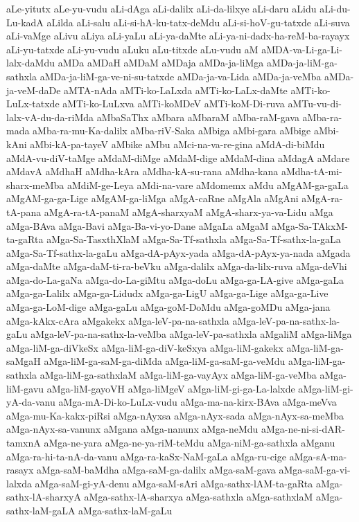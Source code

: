 {aLe-yitutx
aLe-yu-vudu
aLi-dAga
aLi-dalilx
aLi-da-lilxye
aLi-daru
aLidu
aLi-du-Lu-kadA
aLilda
aLi-salu
aLi-si-hA-ku-tatx-deMdu
aLi-si-hoV-gu-tatxde
aLi-suva
aLi-vaMge
aLivu
aLiya
aLi-yaLu
aLi-ya-daMte
aLi-ya-ni-dadx-ha-reM-ba-rayayx
aLi-yu-tatxde
aLi-yu-vudu
aLuku
aLu-titxde
aLu-vudu
aM
aMDA-va-Li-ga-Li-lalx-daMdu
aMDa
aMDaH
aMDaM
aMDaja
aMDa-ja-liMga
aMDa-ja-liM-ga-sathxla
aMDa-ja-liM-ga-ve-ni-su-tatxde
aMDa-ja-va-Lida
aMDa-ja-veMba
aMDa-ja-veM-daDe
aMTA-nAda
aMTi-ko-LaLxda
aMTi-ko-LaLx-daMte
aMTi-ko-LuLx-tatxde
aMTi-ko-LuLxva
aMTi-koMDeV
aMTi-koM-Di-ruva
aMTu-vu-di-lalx-vA-du-da-riMda
aMbaSaThx
aMbara
aMbaraM
aMba-raM-gava
aMba-ra-mada
aMba-ra-mu-Ka-dalilx
aMba-riV-Saka
aMbiga
aMbi-gara
aMbige
aMbi-kAni
aMbi-kA-pa-tayeV
aMbike
aMbu
aMci-na-va-re-gina
aMdA-di-biMdu
aMdA-vu-diV-taMge
aMdaM-diMge
aMdaM-dige
aMdaM-dina
aMdagA
aMdare
aMdavA
aMdhaH
aMdha-kAra
aMdha-kA-su-rana
aMdha-kana
aMdha-tA-mi-sharx-meMba
aMdiM-ge-Leya
aMdi-na-vare
aMdomemx
aMdu
aMgAM-ga-gaLa
aMgAM-ga-ga-Lige
aMgAM-ga-liMga
aMgA-caRne
aMgAla
aMgAni
aMgA-ra-tA-pana
aMgA-ra-tA-panaM
aMgA-sharxyaM
aMgA-sharx-ya-va-Lidu
aMga
aMga-BAva
aMga-Bavi
aMga-Ba-vi-yo-Dane
aMgaLa
aMgaM
aMga-Sa-TAkxM-ta-gaRta
aMga-Sa-TasxthXlaM
aMga-Sa-Tf-sathxla
aMga-Sa-Tf-sathx-la-gaLa
aMga-Sa-Tf-sathx-la-gaLu
aMga-dA-pAyx-yada
aMga-dA-pAyx-ya-nada
aMgada
aMga-daMte
aMga-daM-ti-ra-beVku
aMga-dalilx
aMga-da-lilx-ruva
aMga-deVhi
aMga-do-La-gaNa
aMga-do-La-giMtu
aMga-doLu
aMga-ga-LA-give
aMga-gaLa
aMga-ga-Lalilx
aMga-ga-Lidudx
aMga-ga-LigU
aMga-ga-Lige
aMga-ga-Live
aMga-ga-LoM-dige
aMga-gaLu
aMga-goM-DoMdu
aMga-goMDu
aMga-jana
aMga-kAkx-cAra
aMgakekx
aMga-leV-pa-na-sathxla
aMga-leV-pa-na-sathx-la-gaLu
aMga-leV-pa-na-sathx-la-veMba
aMga-leV-pa-sathxla
aMgaliM
aMga-liMga
aMga-liM-ga-diVkeSx
aMga-liM-ga-diV-keSxya
aMga-liM-gakekx
aMga-liM-ga-saMgaH
aMga-liM-ga-saM-ga-diMda
aMga-liM-ga-saM-ga-veMdu
aMga-liM-ga-sathxla
aMga-liM-ga-sathxlaM
aMga-liM-ga-vayAyx
aMga-liM-ga-veMba
aMga-liM-gavu
aMga-liM-gayoVH
aMga-liMgeV
aMga-liM-gi-ga-La-lalxde
aMga-liM-gi-yA-da-vanu
aMga-mA-Di-ko-LuLx-vudu
aMga-ma-na-kirx-BAva
aMga-meVva
aMga-mu-Ka-kakx-piRsi
aMga-nAyxsa
aMga-nAyx-sada
aMga-nAyx-sa-meMba
aMga-nAyx-sa-vanunx
aMgana
aMga-nanunx
aMga-neMdu
aMga-ne-ni-si-dAR-tamxnA
aMga-ne-yara
aMga-ne-ya-riM-teMdu
aMga-niM-ga-sathxla
aMganu
aMga-ra-hi-ta-nA-da-vanu
aMga-ra-kaSx-NaM-gaLa
aMga-ru-cige
aMga-sA-ma-rasayx
aMga-saM-baMdha
aMga-saM-ga-dalilx
aMga-saM-gava
aMga-saM-ga-vi-lalxda
aMga-saM-gi-yA-denu
aMga-saM-sAri
aMga-sathx-lAM-ta-gaRta
aMga-sathx-lA-sharxyA
aMga-sathx-lA-sharxya
aMga-sathxla
aMga-sathxlaM
aMga-sathx-laM-gaLA
aMga-sathx-laM-gaLu
}
